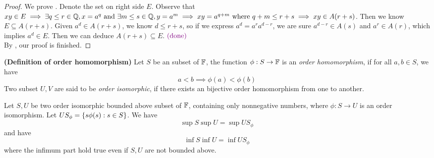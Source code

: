 \documentclass{report}
\begin{document}
\begin{proof}  
We prove . Denote the set on right side $E$. Observe that $xy\in E \implies \exists q\leq r\in\mathbb{Q},x=a^q\text{ and }\exists m\leq s\in\mathbb{Q},y=a^m\implies xy=a^{q+m} \text{ where $q+m\leq r+s$}\implies xy\in A(r+s)$. Then we know $E\subseteq A(r+s)$. Given $a^d\in A(r+s)$, we know $d\leq r+s$, so if we express $a^d=a^ra^{d-r}$, we are sure $a^{d-r}\in A(s)$ and $a^r\in A(r)$, which implies $a^d\in E$. Then we can deduce $A(r+s)\subseteq E$.$\textcolor{violet}{\text{ (done) }}$\\

By , our proof is finished.
\end{proof}
\begin{definition}
\label{1.4.7}
\textbf{(Definition of order homomorphism)} Let $S$ be an subset of  $\mathbb{F}$, the function  $\phi :S \rightarrow  \mathbb{F} $ is an \textit{order homomorphism}, if for all $a,b\in S$, we have 
\begin{equation}
  a<b\implies \phi (a)<\phi (b)
\end{equation}
Two subset $U,V$ are said to be  \textit{order isomorphic}, if there exists an bijective order homomorphism from one to another.
\end{definition}
\begin{lemma}
\label{1.4.8}
Let $S,U$ be two order isomorphic bounded above subset of  $\mathbb{F}$, containing only nonnegative numbers, where $\phi :S\rightarrow U$ is an order isomorphism. Let $US_\phi = \{ s\phi (s):s\in S \}$. We have
\begin{equation}
\sup S \sup U= \sup US_\phi 
\end{equation}
and have
\begin{equation}
\inf S\inf U=\inf US_\phi 
\end{equation}
where the infimum part hold true even if $S,U$ are not bounded above.
\end{lemma}
\end{document}
